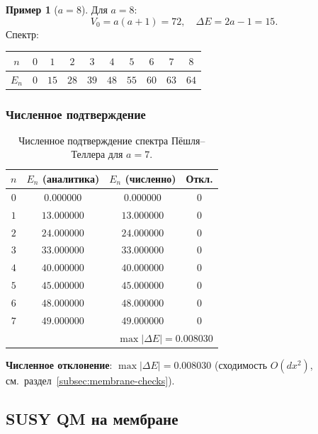 \documentclass[11pt,a4paper]{article}
\theoremstyle{definition}
\newtheorem{example}[theorem]{Пример}
\begin{document}
\begin{example}[$a = 8$]
Для $a = 8$:
\begin{equation}
    V_0 = a(a+1) = 72, \quad
    \Delta E = 2a - 1 = 15.
\end{equation}
Спектр:
\begin{center}
\begin{tabular}{c|ccccccccc}
\toprule
$n$ & $0$ & $1$ & $2$ & $3$ & $4$ & $5$ & $6$ & $7$ & $8$ \\
\midrule
$E_n$ & $0$ & $15$ & $28$ & $39$ & $48$ & $55$ & $60$ & $63$ & $64$ \\
\bottomrule
\end{tabular}
\end{center}
\end{example}

\subsubsection{Численное подтверждение}

\begin{table}[ht]
\centering
\caption{Численное подтверждение спектра Пёшля--Теллера для \texorpdfstring{$a = 7$}{a = 7}.}
\label{tab:membrane-numerical}
\begin{tabular}{cccc}
\toprule
$n$ & $E_n$ (аналитика) & $E_n$ (численно) & Откл. \\
\midrule
$0$ & $0.000000$ & $0.000000$ & $0$ \\
$1$ & $13.000000$ & $13.000000$ & $0$ \\
$2$ & $24.000000$ & $24.000000$ & $0$ \\
$3$ & $33.000000$ & $33.000000$ & $0$ \\
$4$ & $40.000000$ & $40.000000$ & $0$ \\
$5$ & $45.000000$ & $45.000000$ & $0$ \\
$6$ & $48.000000$ & $48.000000$ & $0$ \\
$7$ & $49.000000$ & $49.000000$ & $0$ \\
\midrule
\multicolumn{4}{r}{$\max|\Delta E| = 0.008030$} \\
\bottomrule
\end{tabular}
\end{table}

\medskip\noindent
\textbf{Численное отклонение}: $\max|\Delta E| = 0.008030$
(сходимость $O(dx^2)$, см.~раздел~\ref{subsec:membrane-checks}).

\subsection{SUSY QM на мембране}
\label{subsec:membrane-susy}
\end{document}
